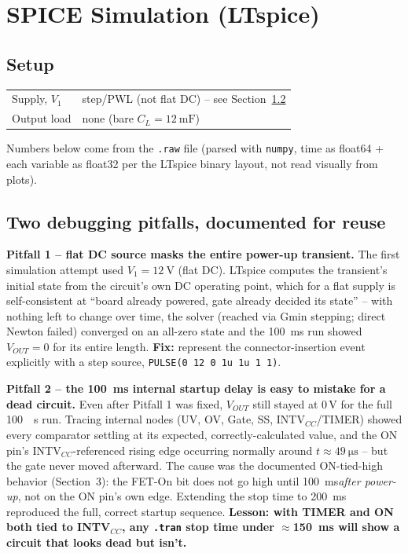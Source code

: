 \documentclass[11pt,letterpaper]{article}
\begin{document}
\section{SPICE Simulation (LTspice)}

\subsection{Setup}

\begin{center}
\begin{tabular}{@{}ll@{}}
\toprule
Supply, $V_1$ & step/PWL (not flat DC) -- see Section~\ref{sec:pitfalls} \\
Output load & none (bare $C_L=\SI{12}{\milli\farad}$) \\
\bottomrule
\end{tabular}
\end{center}

Numbers below come from the \texttt{.raw} file (parsed with \texttt{numpy}, time as float64 + each
variable as float32 per the LTspice binary layout, not read visually from plots).

\subsection{Two debugging pitfalls, documented for reuse}
\label{sec:pitfalls}

\textbf{Pitfall 1 -- flat DC source masks the entire power-up transient.} The first simulation attempt
used $V_1=\SI{12}{\volt}$ (flat DC). LTspice computes the transient's initial state from the circuit's own
DC operating point, which for a flat supply is self-consistent at ``board already powered, gate already
decided its state'' -- with nothing left to change over time, the solver (reached via Gmin stepping; direct
Newton failed) converged on an all-zero state and the \SI{100}{\milli\second} run showed $V_{OUT}=0$ for
its entire length. \textbf{Fix:} represent the connector-insertion event explicitly with a step source,
\texttt{PULSE(0 12 0 1u 1u 1 1)}.

\textbf{Pitfall 2 -- the \SI{100}{\milli\second} internal startup delay is easy to mistake for a dead
circuit.} Even after Pitfall 1 was fixed, $V_{OUT}$ still stayed at 0\,V for the full \SI{100}{\milli
\second} run. Tracing internal nodes (UV, OV, Gate, SS, INTV$_{CC}$/TIMER) showed every comparator settling
at its expected, correctly-calculated value, and the ON pin's INTV$_{CC}$-referenced rising edge occurring
normally around $t\approx\SI{49}{\micro\second}$ -- but the gate never moved afterward. The cause was the
documented ON-tied-high behavior (Section~3): the FET-On bit does not go high until
\SI{100}{\milli\second}\emph{after power-up}, not on the ON pin's own edge. Extending the stop time to
\SI{200}{\milli\second} reproduced the full, correct startup sequence. \textbf{Lesson: with TIMER and ON
both tied to INTV$_{CC}$, any \texttt{.tran} stop time under $\approx$\SI{150}{\milli\second} will show a
circuit that looks dead but isn't.}
\end{document}
